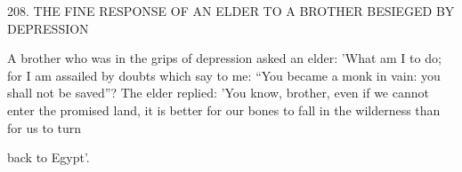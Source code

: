 208. THE FINE RESPONSE OF AN ELDER
TO A BROTHER BESIEGED BY DEPRESSION

A brother who was in the grips of depression asked an elder: 'What
am I to do; for I am assailed by doubts which say to me: “You
became a monk in vain: you shall not be saved”? The elder replied:
'You know, brother, even if we cannot enter the promised land, it
is better for our bones to fall in the wilderness than for us to turn

back to Egypt'.

